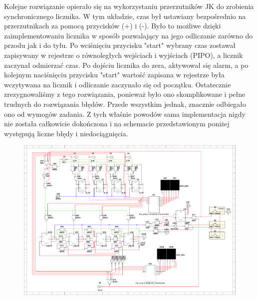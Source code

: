 \documentclass[a4paper]{article}
\begin{document}
Kolejne rozwiązanie opierało się na wykorzystaniu przerzutników JK do zrobienia synchronicznego licznika.
W tym układzie, czas był ustawiany bezpośrednio na przerzutnikach za pomocą przycisków (+) i (-). Było to możliwe
dzięki zaimplementowaniu licznika w sposób pozwalający na jego odliczanie zarówno do przodu jak i do tyłu.
Po wciśnięciu przycisku "start" wybrany czas zostawał zapisywany w rejestrze o równoległych wejściach i wyjściach (PIPO),
a licznik zaczynał odmierzać czas. Po dojściu licznika do zera, aktywował się alarm, a po kolejnym naciśnięciu
przycisku "start" wartość zapisana w rejestrze była wczytywana na licznik i odliczanie zaczynało się od początku.
Ostatecznie zrezygnowaliśmy z tego rozwiązania, ponieważ było ono skomplikowane i pełne trudnych do rozwiązania błędów.
Przede wszystkim jednak, znacznie odbiegało ono od wymogów zadania. Z tych właśnie powodów sama implementacja nigdy
nie została całkowicie dokończona i na schemacie przedstawionym poniżej występują liczne błędy i niedociągnięcia. 

\begin{figure}[H]
    \centering
    \includegraphics[width=\textwidth]{lab2-alt.pdf}
\end{figure}
\end{document}
